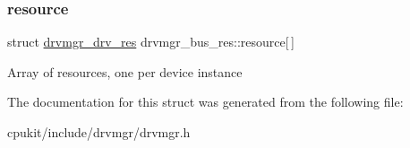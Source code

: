 \subsubsection{\texorpdfstring{resource}{resource}}
{\footnotesize\ttfamily struct \mbox{\hyperlink{structdrvmgr__drv__res}{drvmgr\+\_\+drv\+\_\+res}} drvmgr\+\_\+bus\+\_\+res\+::resource\mbox{[}$\,$\mbox{]}}

Array of resources, one per device instance 

The documentation for this struct was generated from the following file\+:\begin{DoxyCompactItemize}
\item 
cpukit/include/drvmgr/drvmgr.\+h\end{DoxyCompactItemize}
